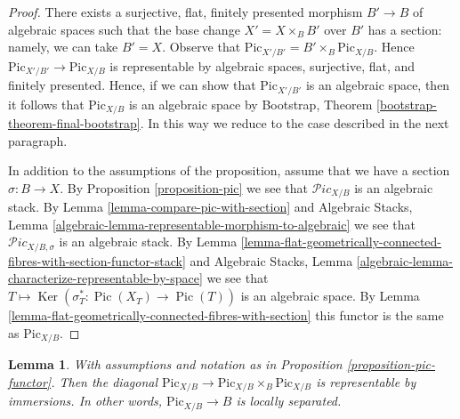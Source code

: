 \documentclass{stacks-project}
\theoremstyle{plain}
\newtheorem{lemma}[subsection]{Lemma}
\theoremstyle{definition}
\theoremstyle{remark}
\numberwithin{equation}{subsection}
\def\Ker{\mathop{\mathrm{Ker}}}
\def\Pic{\mathop{\mathrm{Pic}}\nolimits}
\def\Picardstack{\mathcal{P}\!\mathit{ic}}
\def\Picardfunctor{\mathrm{Pic}}
\begin{document}
\begin{proof}
There exists a surjective, flat, finitely presented morphism
$B' \to B$ of algebraic spaces such that the base change $X' = X \times_B B'$
over $B'$ has a section: namely, we can take $B' = X$.
Observe that $\Picardfunctor_{X'/B'} = B' \times_B \Picardfunctor_{X/B}$.
Hence $\Picardfunctor_{X'/B'} \to \Picardfunctor_{X/B}$ is representable
by algebraic spaces, surjective, flat, and finitely presented.
Hence, if we can show that $\Picardfunctor_{X'/B'}$ is an algebraic space,
then it follows that $\Picardfunctor_{X/B}$
is an algebraic space by Bootstrap, Theorem
\ref{bootstrap-theorem-final-bootstrap}.
In this way we reduce to the case described in the next paragraph.

\medskip\noindent
In addition to the assumptions of the proposition, assume that
we have a section $\sigma : B \to X$. By
Proposition \ref{proposition-pic} we see that
$\Picardstack_{X/B}$ is an algebraic stack.
By Lemma \ref{lemma-compare-pic-with-section} and
Algebraic Stacks, Lemma
\ref{algebraic-lemma-representable-morphism-to-algebraic}
we see that $\Picardstack_{X/B, \sigma}$ is an algebraic stack.
By Lemma
\ref{lemma-flat-geometrically-connected-fibres-with-section-functor-stack}
and Algebraic Stacks, Lemma
\ref{algebraic-lemma-characterize-representable-by-space}
we see that $T \mapsto \Ker(\sigma_T^* : \Pic(X_T) \to \Pic(T))$
is an algebraic space.
By Lemma \ref{lemma-flat-geometrically-connected-fibres-with-section}
this functor is the same as $\Picardfunctor_{X/B}$.
\end{proof}

\begin{lemma}
\label{lemma-diagonal-pic}
With assumptions and notation as in Proposition \ref{proposition-pic-functor}.
Then the diagonal
$\Picardfunctor_{X/B} \to \Picardfunctor_{X/B} \times_B \Picardfunctor_{X/B}$
is representable by immersions. In other words, $\Picardfunctor_{X/B} \to B$
is locally separated.
\end{lemma}
\end{document}
